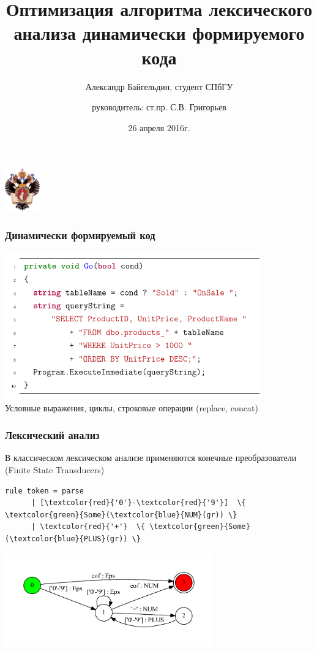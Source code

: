 \documentclass{beamer}
\title[]{Оптимизация алгоритма лексического анализа 
динамически формируемого кода}
\institute[СПбГУ]{
Санкт-Петербургский государственный университет \\
Кафедра системного программирования }
\author[Александр Байгельдин]{Александр Байгельдин, студент СПбГУ\\
  \and  
    {\bfseriesНаучный руководитель:} ст.пр. С.В. Григорьев}
\date{26 апреля 2016г.}
\begin{document}
{
\begin{frame}
  \begin{center}
  {\includegraphics[width=1.5cm]{pictures/SPbGU_Logo.png}}
  \end{center}
  \titlepage
\end{frame}
}

\begin{frame}[fragile]
  \transwipe[direction=90]
  \frametitle{Динамически формируемый код}
  \includegraphics[width=11cm]{pictures/intro_code.pdf} \\
  Условные выражения, циклы, строковые операции (replace, concat) 
\end{frame}
            
\begin{frame}[fragile]
  \transwipe[direction=90]
  \frametitle{Лексический анализ}
  В классическом лексическом анализе применяются конечные преобразователи 
  (Finite State Transducers) \\[1\baselineskip]
  \footnotesize
  \begin{Verbatim}[commandchars=\\\{\}]
      rule token = parse
      | [\textcolor{red}{'0'}-\textcolor{red}{'9'}]  \{ \textcolor{green}{Some}(\textcolor{blue}{NUM}(gr)) \}
      | \textcolor{red}{'+'}  \{ \textcolor{green}{Some}(\textcolor{blue}{PLUS}(gr)) \}
  \end{Verbatim}
  \normalsize
  \includegraphics[width=9cm]{pictures/lexer_.pdf}
\end{frame}
\end{document}
